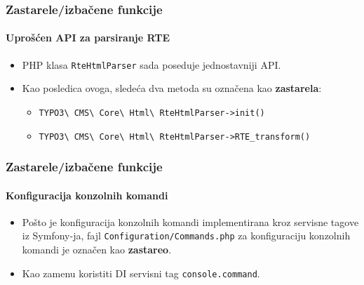 
\begin{frame}[fragile]
	\frametitle{Zastarele/izbačene funkcije}
	\framesubtitle{Uprošćen API za parsiranje RTE}

	\begin{itemize}
		\item PHP klasa \texttt{RteHtmlParser} sada poseduje jednostavniji API.
		\item Kao posledica ovoga, sledeća dva metoda su označena kao \textbf{zastarela}:

			\begin{itemize}
				\item \texttt{TYPO3\textbackslash
					CMS\textbackslash
					Core\textbackslash
					Html\textbackslash
					RteHtmlParser->init()}
				\item \texttt{TYPO3\textbackslash
					CMS\textbackslash
					Core\textbackslash
					Html\textbackslash
					RteHtmlParser->RTE\_transform()}
			\end{itemize}

	\end{itemize}

\end{frame}


\begin{frame}[fragile]
	\frametitle{Zastarele/izbačene funkcije}
	\framesubtitle{Konfiguracija konzolnih komandi}

	\begin{itemize}
		\item Pošto je konfiguracija konzolnih komandi implementirana kroz servisne tagove iz Symfony-ja,
			fajl \texttt{Configuration/Commands.php} za konfiguraciju konzolnih komandi je označen kao
			\textbf{zastareo}.
		\item Kao zamenu koristiti DI servisni tag \texttt{console.command}.

	\end{itemize}

\end{frame}


